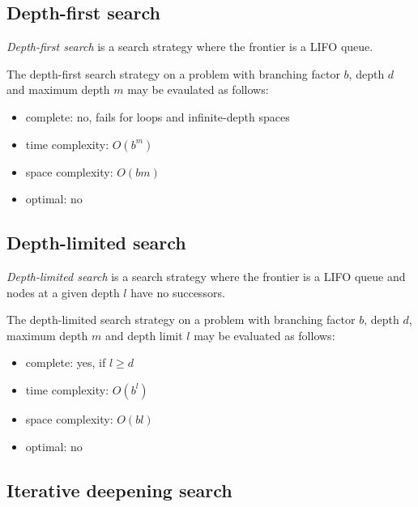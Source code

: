\documentclass{article}
\begin{document}
\subsection{Depth-first search}

\begin{definition}
    \emph{Depth-first search} is a search strategy where the frontier is
    a LIFO queue.
\end{definition}

\begin{theorem}
    The depth-first search strategy on a problem with branching factor $b$,
    depth $d$ and maximum depth $m$ may be evaulated as follows:
    \begin{itemize}
        \item complete: no, fails for loops and infinite-depth spaces
        \item time complexity: $O(b^m)$ 
        \item space complexity: $O(bm)$
        \item optimal: no
    \end{itemize}
\end{theorem}

\subsection{Depth-limited search}

\begin{definition}
    \emph{Depth-limited search} is a search strategy where the frontier is
    a LIFO queue and nodes at a given depth $l$ have no successors.
\end{definition}

\begin{theorem}
    The depth-limited search strategy on a problem with branching factor $b$,
    depth $d$, maximum depth $m$ and depth limit $l$ may be evaluated as follows:
    \begin{itemize}
        \item complete: yes, if $l\geq d$
        \item time complexity: $O(b^l)$
        \item space complexity: $O(bl)$
        \item optimal: no
    \end{itemize}
\end{theorem}

\subsection{Iterative deepening search}
\end{document}
